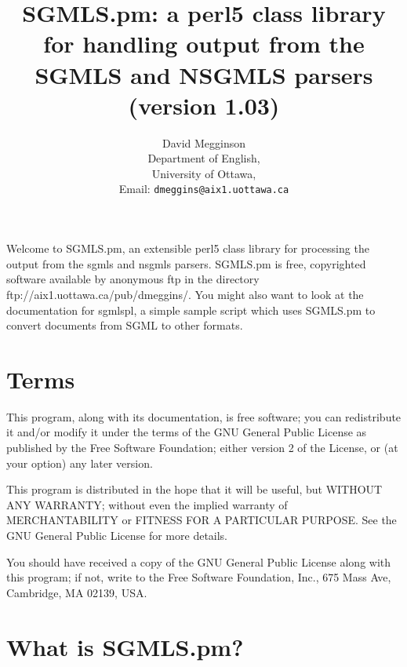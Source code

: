 
\setlength{\parskip}{3ex}
\raggedright

\title{SGMLS.pm: a perl5 class library for handling output from the
SGMLS and NSGMLS parsers (version 1.03)}
\author{David Megginson \\
  Department of English, \\
  University of Ottawa, \\
  Email: {\tt dmeggins@aix1.uottawa.ca} \\
}



\maketitle


Welcome to {\sc SGMLS.pm}, an extensible {\sc perl5} class library for
processing the output from the {\sc sgmls} and {\sc nsgmls} parsers.
{\sc SGMLS.pm} is free, copyrighted software available by anonymous ftp in
the directory ftp://aix1.uottawa.ca/pub/dmeggins/.
You might also want to look at the documentation for {\sc sgmlspl},
a simple sample script which uses {\sc SGMLS.pm} to convert documents from
{\sc SGML} to other formats.


{\em\section{Terms}
\label{TERMS}


This program, along with its documentation, is free software;
you can redistribute it and/or modify it under the terms of the GNU
General Public License as published by the Free Software Foundation;
either version 2 of the License, or (at your option) any later
version.

This program is distributed in the hope that it will be useful,
but WITHOUT ANY WARRANTY; without even the implied warranty of
MERCHANTABILITY or FITNESS FOR A PARTICULAR PURPOSE.  See the GNU
General Public License for more details.

You should have received a copy of the GNU General Public
License along with this program; if not, write to the Free Software
Foundation, Inc., 675 Mass Ave, Cambridge, MA 02139, USA.


}



\section{What is {\sc SGMLS.pm}?}
\label{DEFINITION}


